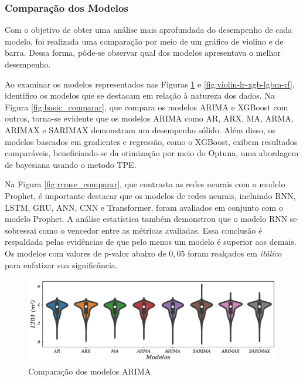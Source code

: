\subsubsection{Compara\c c\~ao dos Modelos}

Com o objetivo de obter uma análise mais aprofundada do desempenho de cada modelo, foi realizada uma comparação por meio de um gráfico de violino e de barra. Dessa forma, pôde-se observar qual dos modelos apresentava o melhor desempenho.



Ao examinar os modelos representados nas Figuras \ref{fig:modelos-arima} e \ref{fig:violin-lr-xgb-lgbm-rf}, identifico os modelos que se destacam em relação à natureza dos dados. Na Figura \ref{fig:basic_comparar}, que compara os modelos ARIMA e XGBoost com outros, torna-se evidente que os modelos ARIMA como AR, ARX, MA, ARMA, ARIMAX e SARIMAX demonstram um desempenho sólido. Além disso, os modelos baseados em gradientes e regressão, como o XGBoost, exibem resultados comparáveis, beneficiando-se da otimização por meio do Optuna, uma abordagem de bayesiana usando o metodo TPE.

Na Figura \ref{fig:rrmse_comparar}, que contrasta as redes neurais com o modelo Prophet, é importante destacar que os modelos de redes neurais, incluindo RNN, LSTM, GRU, ANN, CNN e Transformer, foram avaliados em conjunto com o modelo Prophet. A análise estatística também demonstrou que o modelo RNN se sobressai como o vencedor entre as métricas avaliadas. Essa conclusão é respaldada pelas evidências de que pelo menos um modelo é superior aos demais. Os modelos com valores de p-valor abaixo de $0,05$ foram realçados em \textit{itálico} para enfatizar sua significância.

\begin{figure}[!htb]
	\centering
	\caption{Comparação dos modelos ARIMA}\label{fig:modelos-arima}
	\includegraphics[width=\linewidth]{Resultados/Figuras/modelos-arima}
	
	
\end{figure}

